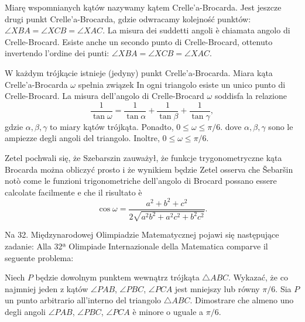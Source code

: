 Miarę wspomnianych kątów nazywamy kątem Crelle'a-Brocarda. %
Jest jeszcze drugi punkt Crelle'a-Brocarda, gdzie odwracamy kolejność punktów: $\angle XBA = \angle XCB = \angle XAC$. %
La misura dei suddetti angoli è chiamata angolo di Crelle-Brocard. %
Esiste anche un secondo punto di Crelle-Brocard, ottenuto invertendo l'ordine dei punti: $\angle XBA = \angle XCB = \angle XAC$. %

\begin{proposition}
\label{miara_kata_crellea_brocarda}%
    W każdym trójkącie istnieje (jedyny) punkt Crelle'a-Brocarda. %
    Miara kąta Crelle'a-Brocarda $\omega$ spełnia związek %
    In ogni triangolo esiste un unico punto di Crelle-Brocard. %
    La misura dell'angolo di Crelle-Brocard $\omega$ soddisfa la relazione %
    \begin{equation}
        \frac 1 {\tan \omega} = \frac 1 {\tan \alpha} + \frac 1 {\tan \beta} + \frac 1 {\tan \gamma},
    \end{equation}
    gdzie $\alpha, \beta, \gamma$ to miary kątów trójkąta. %
    Ponadto, $0 \le \omega \le \pi/6$. %
    dove $\alpha, \beta, \gamma$ sono le ampiezze degli angoli del triangolo. %
    Inoltre, $0 \le \omega \le \pi/6$. %
\end{proposition}

Zetel \cite[s. 176]{zetel_2020} pochwali się, że Szebarszin zauważył, że funkcje trygonometryczne kąta Brocarda można obliczyć prosto i że wynikiem będzie %
Zetel \cite[p. 176]{zetel_2020} osserva che Šebaršin notò come le funzioni trigonometriche dell'angolo di Brocard possano essere calcolate facilmente e che il risultato è %
%
\begin{equation}
    \cos \omega = \frac{a^2 + b^2 + c^2}{2\sqrt{a^2b^2 + a^2c^2 + b^2c^2}}.
\end{equation}

Na 32. Międzynarodowej Olimpiadzie Matematycznej pojawi się następujące zadanie: %
Alla 32ª Olimpiade Internazionale della Matematica comparve il seguente problema: %

\begin{problem}
    Niech $P$ będzie dowolnym punktem wewnątrz trójkąta $\triangle ABC$. %
    Wykazać, że co najmniej jeden z kątów $\angle PAB$, $\angle PBC$, $\angle PCA$ jest mniejszy lub równy $\pi /6$. %
    Sia $P$ un punto arbitrario all'interno del triangolo $\triangle ABC$. %
    Dimostrare che almeno uno degli angoli $\angle PAB$, $\angle PBC$, $\angle PCA$ è minore o uguale a $\pi /6$. %
\end{problem}

